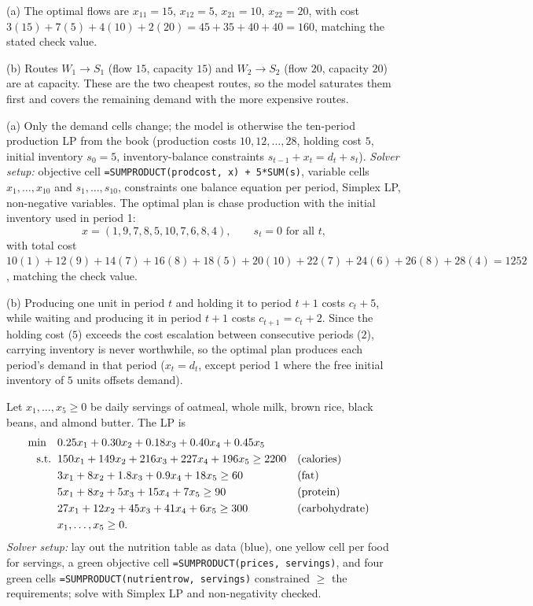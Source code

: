 (a) The optimal flows are $x_{11} = 15$, $x_{12} = 5$, $x_{21} = 10$, $x_{22} = 20$, with cost $3(15) + 7(5) + 4(10) + 2(20) = 45 + 35 + 40 + 40 = 160$, matching the stated check value.

(b) Routes $W_1 \to S_1$ (flow $15$, capacity $15$) and $W_2 \to S_2$ (flow $20$, capacity $20$) are at capacity. These are the two cheapest routes, so the model saturates them first and covers the remaining demand with the more expensive routes.


(a) Only the demand cells change; the model is otherwise the ten-period production LP from the book (production costs $10, 12, \dots, 28$, holding cost $5$, initial inventory $s_0 = 5$, inventory-balance constraints $s_{t-1} + x_t = d_t + s_t$). \emph{Solver setup:} objective cell \texttt{=SUMPRODUCT(prodcost, x) + 5*SUM(s)}, variable cells $x_1,\dots,x_{10}$ and $s_1,\dots,s_{10}$, constraints one balance equation per period, Simplex LP, non-negative variables. The optimal plan is chase production with the initial inventory used in period 1:
\[
x = (1, 9, 7, 8, 5, 10, 7, 6, 8, 4), \qquad s_t = 0 \text{ for all } t,
\]
with total cost $10(1) + 12(9) + 14(7) + 16(8) + 18(5) + 20(10) + 22(7) + 24(6) + 26(8) + 28(4) = 1252$, matching the check value.

(b) Producing one unit in period $t$ and holding it to period $t+1$ costs $c_t + 5$, while waiting and producing it in period $t+1$ costs $c_{t+1} = c_t + 2$. Since the holding cost ($5$) exceeds the cost escalation between consecutive periods ($2$), carrying inventory is never worthwhile, so the optimal plan produces each period's demand in that period ($x_t = d_t$, except period 1 where the free initial inventory of $5$ units offsets demand).


Let $x_1, \dots, x_5 \geq 0$ be daily servings of oatmeal, whole milk, brown rice, black beans, and almond butter. The LP is
\begin{align*}
\min \quad & 0.25x_1 + 0.30x_2 + 0.18x_3 + 0.40x_4 + 0.45x_5\\
\text{s.t.}\;\; & 150x_1 + 149x_2 + 216x_3 + 227x_4 + 196x_5 \geq 2200 && \text{(calories)}\\
& 3x_1 + 8x_2 + 1.8x_3 + 0.9x_4 + 18x_5 \geq 60 && \text{(fat)}\\
& 5x_1 + 8x_2 + 5x_3 + 15x_4 + 7x_5 \geq 90 && \text{(protein)}\\
& 27x_1 + 12x_2 + 45x_3 + 41x_4 + 6x_5 \geq 300 && \text{(carbohydrate)}\\
& x_1, \dots, x_5 \geq 0.
\end{align*}
\emph{Solver setup:} lay out the nutrition table as data (blue), one yellow cell per food for servings, a green objective cell \texttt{=SUMPRODUCT(prices, servings)}, and four green cells \texttt{=SUMPRODUCT(nutrientrow, servings)} constrained $\geq$ the requirements; solve with Simplex LP and non-negativity checked.

